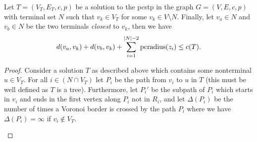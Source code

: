 \begin{theorem}\label{thm:vor:1}
  Let $T = (V_T, E_T, c, p)$ be a solution to the \gls{pcstp} in the graph $G = (V, E, c, p)$ with terminal set $N$ such that
  $v_k \in V_T$ for some $v_k \in V \setminus N$. Finally, let $v_a \in N$ and $v_b \in N$ be the two terminals \textit{closest}
  to $v_k$, then we have
  $$d(v_a, v_k) + d(v_b, v_k) + \sum_{i = 1}^{|N| - 2} \operatorname{pcradius}(z_i) \leq c(T)\mathnormal{.}$$
\end{theorem}
\begin{proof}
  Consider a solution $T$ as described above which contains some nonterminal $u \in V_T$.
  For all $i \in (N \cap V_T)$ let $P_i$ be the
  path from $v_i$ to $u$ in $T$ (this must be well defined as $T$ is a tree). Furthermore,
  let $P_i'$ be the subpath of $P_i$ which starts in $v_i$ and ends in the first vertex along
  $P_i$ not in $R_i$, and
  let $\Delta(P_i)$ be the number of times a Voronoi border is crossed by the path $P_i$ where
  we have $\Delta(P_i) = \infty$ if $v_i \not\in V_T$.

  \begin{figure}[h!]
     \centering
\end{figure}
\end{proof}
